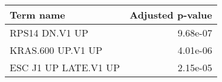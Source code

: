 \begin{tabular}{lr}
\toprule
           Term name &  Adjusted p-value \\
\midrule
      RPS14 DN.V1 UP &          9.68e-07 \\
   KRAS.600 UP.V1 UP &          4.01e-06 \\
ESC J1 UP LATE.V1 UP &          2.15e-05 \\
\bottomrule
\end{tabular}
